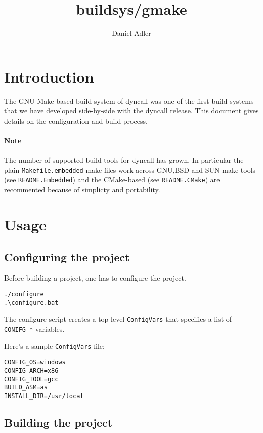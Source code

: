 \documentclass{article}
\newcommand{\var}[1]{{\tt #1}}
\newcommand{\file}[1]{{\tt #1}}
\begin{document}
\title{buildsys/gmake}
\author{Daniel Adler}
\maketitle

\section{Introduction}

The GNU Make-based build system of dyncall was one of the first 
build systems that we have developed side-by-side with the dyncall release.
This document gives details on the configuration and build process.

\paragraph{Note} The number of supported build tools for dyncall has grown.
In particular the plain \file{Makefile.embedded} make files work across
GNU,BSD and SUN make tools (see \file{README.Embedded}) and the CMake-based 
(see \file{README.CMake}) are recommented because of simplicty and portability.

\section{Usage}

\subsection{Configuring the project}

Before building a project, one has to configure the project.

\begin{verbatim}
./configure
.\configure.bat
\end{verbatim}

The configure script creates a top-level \file{ConfigVars} that
specifies a list of \var{CONIFG\_*} variables.

Here's a sample \file{ConfigVars} file:

\begin{verbatim}
CONFIG_OS=windows
CONFIG_ARCH=x86
CONFIG_TOOL=gcc
BUILD_ASM=as
INSTALL_DIR=/usr/local
\end{verbatim}

\subsection{Building the project}
\end{document}
